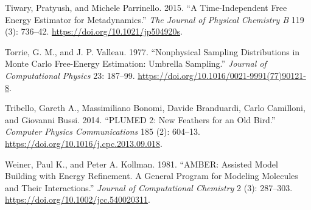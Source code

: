 \begin{CSLReferences}{1}{0}
\leavevmode{}%
Tiwary, Pratyush, and Michele Parrinello. 2015. {``A Time-Independent Free Energy Estimator for Metadynamics.''} \emph{The Journal of Physical Chemistry B} 119 (3): 736--42. \url{https://doi.org/10.1021/jp504920s}.

\leavevmode{}%
Torrie, G. M., and J. P. Valleau. 1977. {``Nonphysical Sampling Distributions in Monte Carlo Free-Energy Estimation: Umbrella Sampling.''} \emph{Journal of Computational Physics} 23: 187--99. \url{https://doi.org/10.1016/0021-9991(77)90121-8}.

\leavevmode{}%
Tribello, Gareth A., Massimiliano Bonomi, Davide Branduardi, Carlo Camilloni, and Giovanni Bussi. 2014. {``PLUMED 2: New Feathers for an Old Bird.''} \emph{Computer Physics Communications} 185 (2): 604--13. \url{https://doi.org/10.1016/j.cpc.2013.09.018}.

\leavevmode{}%
Weiner, Paul K., and Peter A. Kollman. 1981. {``AMBER: Assisted Model Building with Energy Refinement. A General Program for Modeling Molecules and Their Interactions.''} \emph{Journal of Computational Chemistry} 2 (3): 287--303. \url{https://doi.org/10.1002/jcc.540020311}.

\end{CSLReferences}



\address{%
Dalibor Trapl\\
Department of Biochemistry and Microbiology, University of Chemistry and Technology, Prague\\%
Technicka 3\\ Prague 6, 166 28, Czech Republic\\
%
%
\textit{ORCiD: \href{https://orcid.org/0000-0002-3435-5841}{0000-0002-3435-5841}}\\%
\href{mailto:dalibor.trapl@gmail.com}{\nolinkurl{dalibor.trapl@gmail.com}}%
}

\address{%
Vojtech Spiwok\\
Department of Biochemistry and Microbiology, University of Chemistry and Technology, Prague\\%
Technicka 3\\ Prague 6, 166 28, Czech Republic\\
%
%
\textit{ORCiD: \href{https://orcid.org/0000-0001-8108-2033}{0000-0001-8108-2033}}\\%
\href{mailto:spiwokv@vscht.cz}{\nolinkurl{spiwokv@vscht.cz}}%
}
